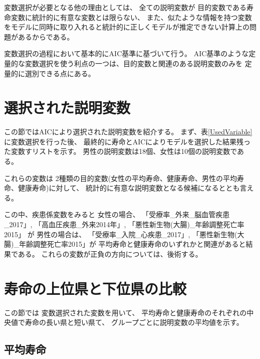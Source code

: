 \documentclass[a4j,11pt,mc]{jreport}
\newcommand{\tb}[1]{\textcolor{blue}{#1}} %
\begin{document}
変数選択が必要となる他の理由としては、
全ての説明変数が
目的変数である寿命変数に統計的に有意な変数とは限らない、
また、似たような情報を持つ変数をモデルに同時に取り入れると統計的に正しくモデルが推定できない計算上の問題があるからである。

変数選択の過程において基本的にAIC基準に基づいて行う。
AIC基準のような定量的な変数選択を使う利点の一つは、目的変数と関連のある説明変数のみを
定量的に選別できる点にある。


%
%
%


\section{選択された説明変数}

この節ではAICにより選択された説明変数を紹介する。
まず、表\ref{UsedVariable}に変数選択を行った後、
最終的に寿命とAICによりモデルを選択した結果残った変数すリストを示す。
男性の説明変数は18個、女性は10個の説明変数である。


これらの変数は
2種類の目的変数(女性の平均寿命、健康寿命、男性の平均寿命、健康寿命)に対して、
統計的に有意な説明変数となる候補になるととも言える。



この中、疾患係変数をみると
女性の場合、
「受療率\_外来\_脳血管疾患\_2017」,
「高血圧疾患\_外来2014年」,
「悪性新生物(大腸)\_年齢調整死亡率2015」
が
男性の場合は、
「受療率\_入院\_心疾患\_2017」,
「悪性新生物(大腸)\_年齢調整死亡率2015」が
平均寿命と健康寿命のいずれかと関連があると結果である。
これらの変数が正負の方向については、後術する。





\section{寿命の上位県と下位県の比較}
この節では
変数選択された変数を用いて、
平均寿命と健康寿命のそれぞれの中央値で寿命の長い県と短い県て、
グループごとに説明変数の平均値を示す。


\subsection{平均寿命}
\lipsum[2]
\end{document}
